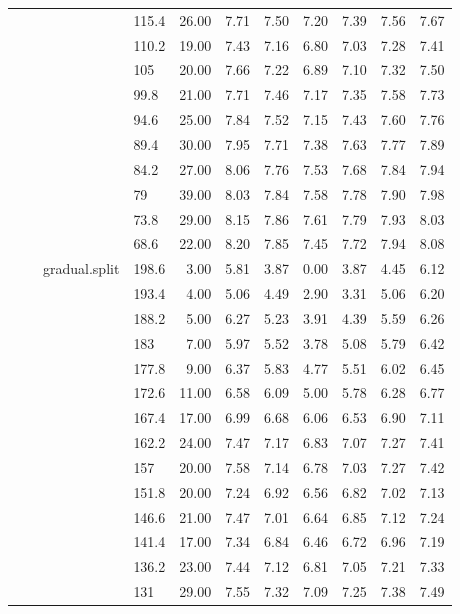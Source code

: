 \begin{longtable}{llllrrrrrrr}
   &  &  & 115.4 & 26.00 & 7.71 & 7.50 & 7.20 & 7.39 & 7.56 & 7.67 \\ 
   &  &  & 110.2 & 19.00 & 7.43 & 7.16 & 6.80 & 7.03 & 7.28 & 7.41 \\ 
   &  &  & 105 & 20.00 & 7.66 & 7.22 & 6.89 & 7.10 & 7.32 & 7.50 \\ 
   &  &  & 99.8 & 21.00 & 7.71 & 7.46 & 7.17 & 7.35 & 7.58 & 7.73 \\ 
   &  &  & 94.6 & 25.00 & 7.84 & 7.52 & 7.15 & 7.43 & 7.60 & 7.76 \\ 
   &  &  & 89.4 & 30.00 & 7.95 & 7.71 & 7.38 & 7.63 & 7.77 & 7.89 \\ 
   &  &  & 84.2 & 27.00 & 8.06 & 7.76 & 7.53 & 7.68 & 7.84 & 7.94 \\ 
   &  &  & 79 & 39.00 & 8.03 & 7.84 & 7.58 & 7.78 & 7.90 & 7.98 \\ 
   &  &  & 73.8 & 29.00 & 8.15 & 7.86 & 7.61 & 7.79 & 7.93 & 8.03 \\ 
   &  &  & 68.6 & 22.00 & 8.20 & 7.85 & 7.45 & 7.72 & 7.94 & 8.08 \\ 
   &  & gradual.split & 198.6 & 3.00 & 5.81 & 3.87 & 0.00 & 3.87 & 4.45 & 6.12 \\ 
   &  &  & 193.4 & 4.00 & 5.06 & 4.49 & 2.90 & 3.31 & 5.06 & 6.20 \\ 
   &  &  & 188.2 & 5.00 & 6.27 & 5.23 & 3.91 & 4.39 & 5.59 & 6.26 \\ 
   &  &  & 183 & 7.00 & 5.97 & 5.52 & 3.78 & 5.08 & 5.79 & 6.42 \\ 
   &  &  & 177.8 & 9.00 & 6.37 & 5.83 & 4.77 & 5.51 & 6.02 & 6.45 \\ 
   &  &  & 172.6 & 11.00 & 6.58 & 6.09 & 5.00 & 5.78 & 6.28 & 6.77 \\ 
   &  &  & 167.4 & 17.00 & 6.99 & 6.68 & 6.06 & 6.53 & 6.90 & 7.11 \\ 
   &  &  & 162.2 & 24.00 & 7.47 & 7.17 & 6.83 & 7.07 & 7.27 & 7.41 \\ 
   &  &  & 157 & 20.00 & 7.58 & 7.14 & 6.78 & 7.03 & 7.27 & 7.42 \\ 
   &  &  & 151.8 & 20.00 & 7.24 & 6.92 & 6.56 & 6.82 & 7.02 & 7.13 \\ 
   &  &  & 146.6 & 21.00 & 7.47 & 7.01 & 6.64 & 6.85 & 7.12 & 7.24 \\ 
   &  &  & 141.4 & 17.00 & 7.34 & 6.84 & 6.46 & 6.72 & 6.96 & 7.19 \\ 
   &  &  & 136.2 & 23.00 & 7.44 & 7.12 & 6.81 & 7.05 & 7.21 & 7.33 \\ 
   &  &  & 131 & 29.00 & 7.55 & 7.32 & 7.09 & 7.25 & 7.38 & 7.49 \\ 

\end{longtable}
